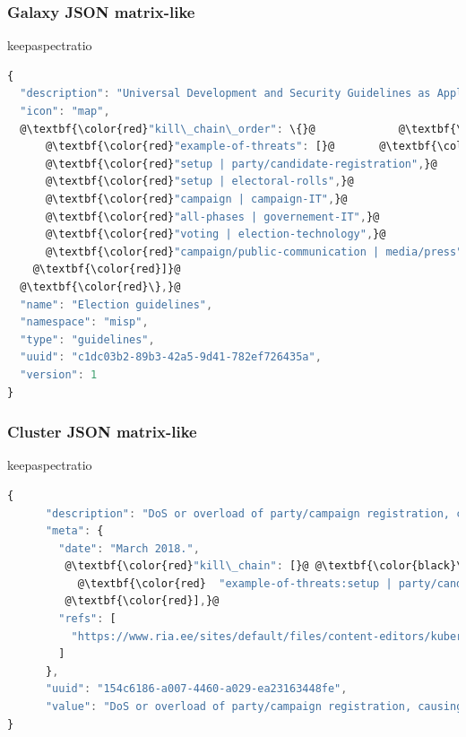 \begin{frame}[fragile]
        \frametitle{Galaxy JSON matrix-like}
        \begin{adjustbox}{keepaspectratio}
            \begin{lstlisting}[language=javascript,firstnumber=1,escapechar=@]
{
  "description": "Universal Development and Security Guidelines as Applicable to Election Technology.",
  "icon": "map",
  @\textbf{\color{red}"kill\_chain\_order": \{}@             @\textbf{\color{black}\textbackslash\textbackslash Tab in the matrix}@
      @\textbf{\color{red}"example-of-threats": [}@       @\textbf{\color{black}\textbackslash\textbackslash Column in the matrix}@
      @\textbf{\color{red}"setup | party/candidate-registration",}@
      @\textbf{\color{red}"setup | electoral-rolls",}@
      @\textbf{\color{red}"campaign | campaign-IT",}@
      @\textbf{\color{red}"all-phases | governement-IT",}@
      @\textbf{\color{red}"voting | election-technology",}@
      @\textbf{\color{red}"campaign/public-communication | media/press"}@
    @\textbf{\color{red}]}@
  @\textbf{\color{red}\},}@
  "name": "Election guidelines",
  "namespace": "misp",
  "type": "guidelines",
  "uuid": "c1dc03b2-89b3-42a5-9d41-782ef726435a",
  "version": 1
}
        \end{lstlisting}
        \end{adjustbox}
\end{frame}

\begin{frame}[fragile]
        \frametitle{Cluster JSON matrix-like}
        \begin{adjustbox}{keepaspectratio}
            \begin{lstlisting}[language=javascript,firstnumber=1,escapechar=@]
{
      "description": "DoS or overload of party/campaign registration, causing them to miss the deadline",
      "meta": {
        "date": "March 2018.",
         @\textbf{\color{red}"kill\_chain": [}@ @\textbf{\color{black}\textbackslash\textbackslash Define in which column the cluster should be placed}@
           @\textbf{\color{red}  "example-of-threats:setup | party/candidate-registration"}@
         @\textbf{\color{red}],}@
        "refs": [
          "https://www.ria.ee/sites/default/files/content-editors/kuberturve/cyber_security_of_election_technology.pdf"
        ]
      },
      "uuid": "154c6186-a007-4460-a029-ea23163448fe",
      "value": "DoS or overload of party/campaign registration, causing them to miss the deadline"
}
        \end{lstlisting}
        \end{adjustbox}
\end{frame}


